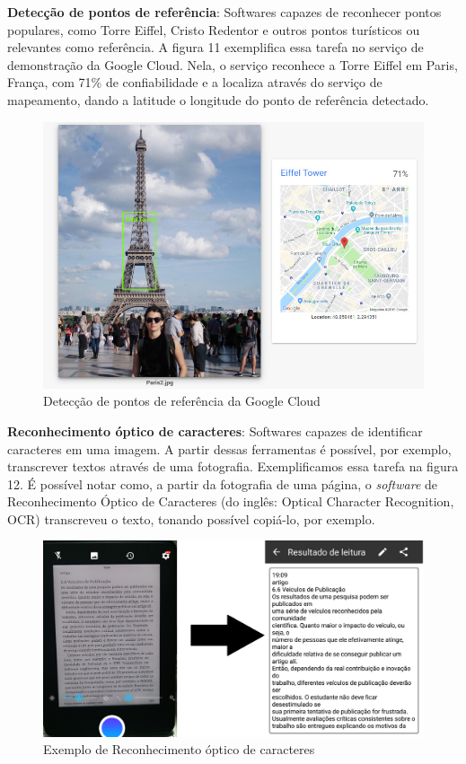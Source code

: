 \documentclass{article}
\begin{document}
\textbf{Detecção de pontos de referência}: Softwares capazes de reconhecer pontos populares, como Torre Eiffel, Cristo Redentor e outros pontos turísticos ou relevantes como referência. A figura 11 exemplifica essa tarefa no serviço de demonstração da Google Cloud. Nela, o serviço reconhece a Torre Eiffel em Paris, França, com 71\% de confiabilidade e a localiza através do serviço de mapeamento, dando a latitude o longitude do ponto de referência detectado. \\
\begin{figure}[H]
    \centering
    \includegraphics[scale=0.3]{imagens/Paris2.jpg}
    \caption{Detecção de pontos de referência da Google Cloud}
    \label{fig:ponto_turistico}
\end{figure}{}
\textbf{Reconhecimento óptico de caracteres}: Softwares capazes de identificar caracteres em uma imagem. A partir dessas ferramentas é possível, por exemplo, transcrever textos através de uma fotografia. Exemplificamos essa tarefa na figura 12. É possível notar como, a partir da fotografia de uma página, o \textit{software} de Reconhecimento Óptico de Caracteres (do inglês: Optical Character Recognition, OCR) transcreveu o texto, tonando possível copiá-lo, por exemplo. \\
\begin{figure}[H]
    \centering
    \includegraphics[scale=0.15]{imagens/ocr.png}
    \caption{Exemplo de Reconhecimento óptico de caracteres}
    \label{fig:ocr}
\end{figure}{}
\end{document}
